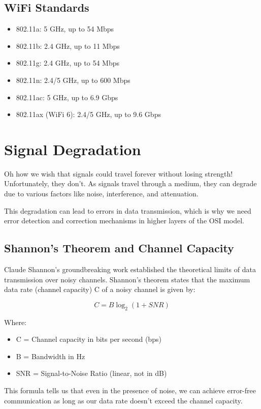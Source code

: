 \subsection*{WiFi Standards}
\begin{itemize}
    \item 802.11a: 5 GHz, up to 54 Mbps
    \item 802.11b: 2.4 GHz, up to 11 Mbps
    \item 802.11g: 2.4 GHz, up to 54 Mbps
    \item 802.11n: 2.4/5 GHz, up to 600 Mbps
    \item 802.11ac: 5 GHz, up to 6.9 Gbps
    \item 802.11ax (WiFi 6): 2.4/5 GHz, up to 9.6 Gbps
\end{itemize}

\section{Signal Degradation}
Oh how we wish that signals could travel forever without losing strength! Unfortunately, they don't. As signals travel through a medium, they can degrade due to various factors like noise, interference, and attenuation.

This degradation can lead to errors in data transmission, which is why we need error detection and correction mechanisms in higher layers of the OSI model.

\subsection*{Shannon's Theorem and Channel Capacity}
Claude Shannon's groundbreaking work established the theoretical limits of data transmission over noisy channels. Shannon's theorem states that the maximum data rate (channel capacity) C of a noisy channel is given by:

\begin{equation}
C = B \log_2(1 + SNR)
\end{equation}

Where:
\begin{itemize}
    \item C = Channel capacity in bits per second (bps)
    \item B = Bandwidth in Hz
    \item SNR = Signal-to-Noise Ratio (linear, not in dB)
\end{itemize}

This formula tells us that even in the presence of noise, we can achieve error-free communication as long as our data rate doesn't exceed the channel capacity.

